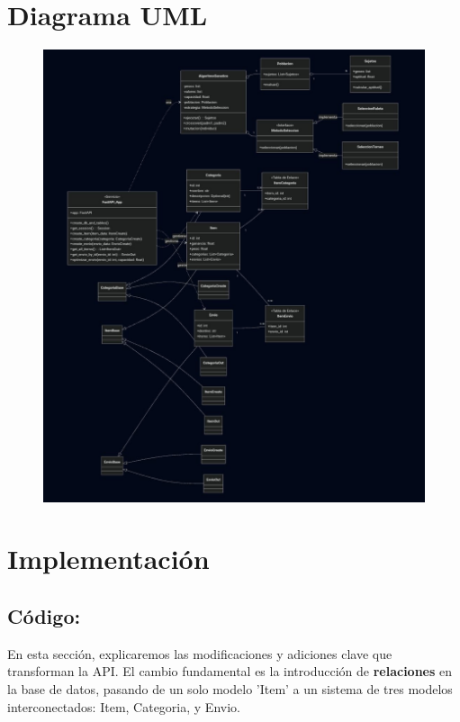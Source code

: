 \documentclass[12pt]{article}
\begin{document}
\section{Diagrama UML}
\begin{figure}[H]
    \centering
    \includegraphics[width=1\textwidth]{Imagenes/diagramauml.jpeg}
\end{figure}


\section{Implementación}
\subsection*{Código:}
En esta sección, explicaremos las modificaciones y adiciones clave que transforman la API. El cambio fundamental es la introducción de \textbf{relaciones} en la base de datos, pasando de un solo modelo 'Item' a un sistema de tres modelos interconectados: Item, Categoria, y Envio.
\end{document}
